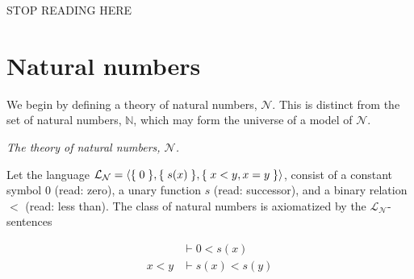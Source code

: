










\pagebreak

STOP READING HERE

\pagebreak

\section{Natural numbers}

We begin by defining a theory of natural numbers, $\mathcal{N}$. This is
distinct from the set of natural numbers, $\mathbb{N}$, which may form the
universe of a model of $\mathcal{N}$.

\begin{definition} \textit{The theory of natural numbers, $\mathcal{N}$.}

Let the language
$\mathcal{L}_{\mathcal{N}}=\mathopen{}\left\langle{\ensuremath{\mathopen{}\left\{\mathrel{}{0}\mathrel{}\right\}\mathclose{}},\ensuremath{\mathopen{}\left\{\mathrel{}{s(x)}\mathrel{}\right\}\mathclose{}},\ensuremath{\mathopen{}\left\{\mathrel{}{x<y,x=y}\mathrel{}\right\}\mathclose{}}}\right\rangle\mathclose{}$, consist of
a constant symbol $0$ (read: zero), a unary function $s$ (read: successor), and
a binary relation $<$ (read: less than). The class of natural numbers is
axiomatized by the $\mathcal{L}_{\mathcal{N}}$-sentences

\begin{align}
&\vdash 0 < s(x) \\
x < y &\vdash s(x) < s(y)
\end{align}

\end{definition}

